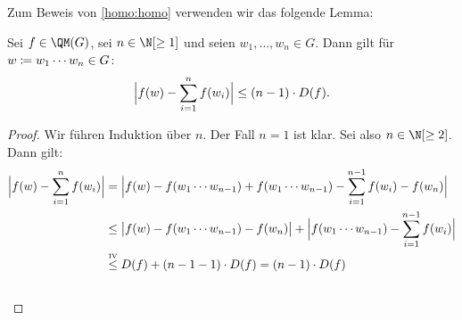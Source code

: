 Zum Beweis von \cref{homo:homo} verwenden wir das folgende Lemma:

\begin{thLemma} \label{homo:qmprod}
    Sei $f\in\QM(G)$, sei $n\in\N[\geq1]$ und seien
    $w_1,\dots,w_n\in G$. Dann gilt für $w\defeq w_1\cdots w_n\in G$:
    \[ \abs[\Big]{ f(w) - \isum^n f(w_i) } \leq (n-1)\cdot D(f)  . \]
\end{thLemma}

\begin{proof}
   Wir führen Induktion über $n$. Der Fall $n=1$ ist klar. Sei also
   $n\in\N[\geq2]$. Dann gilt:
   \begin{align*}
       \abs[\Big]{ f(w) - \isum^n f(w_i) }
       &= \abs[\Big]{
           f(w) - f(w_1\cdots w_{n-1}) + f(w_1\cdots w_{n-1})
           - \isum^{n-1} f(w_i) - f(w_n)
          }
       \\
       &\leq
       \abs[\big]{f(w) - f(w_1\cdots w_{n-1}) - f(w_n)}
       + \abs[\Big]{f(w_1\cdots w_{n-1}) - \isum^{n-1} f(w_i)}
       \\
       &\overset{\text{\clap{\tiny IV}}}\leq
           D(f) + (n-1-1) \cdot D(f)
        = (n-1) \cdot D(f)
        \\
        &\qedhere
   \end{align*}
\end{proof}

